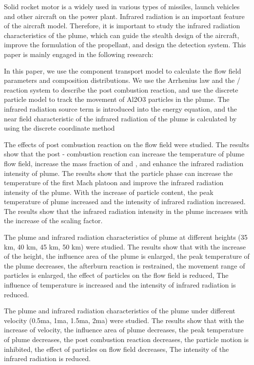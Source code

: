 \begin{enabstract}
 Solid rocket motor is a widely used in various types of missiles, launch vehicles and other aircraft on the power plant. Infrared radiation is an important feature of the aircraft model. Therefore, it is important to study the infrared radiation characteristics of the plume, which can guide the stealth design of the aircraft, improve the formulation of the propellant, and design the detection system. This paper is mainly engaged in the following research:
 
 In this paper, we use the component transport model to calculate the flow field parameters and composition distributions. We use the Arrhenius law and the /  reaction system to describe the post combustion reaction, and use the discrete particle model to track the movement of Al2O3 particles in the plume. The infrared radiation source term is introduced into the energy equation, and the near field characteristic of the infrared radiation of the plume is calculated by using the discrete coordinate method
 
 The effects of post combustion reaction on the flow field were studied. The results show that the post - combustion reaction can increase the temperature of plume flow field, increase the mass fraction of  and , and enhance the infrared radiation intensity of plume. The results show that the particle phase can increase the temperature of the first Mach platoon and improve the infrared radiation intensity of the plume. With the increase of particle content, the peak temperature of plume increased and the intensity of infrared radiation increased. The results show that the infrared radiation intensity in the plume increases with the increase of the scaling factor.
 
 The plume and infrared radiation characteristics of plume at different heights (35 \si{km}, 40 km, 45 km, 50 km) were studied. The results show that with the increase of the height, the influence area of the plume is enlarged, the peak temperature of the plume decreases, the afterburn reaction is restrained, the movement range of particles is enlarged, the effect of particles on the flow field is reduced, The influence of temperature is increased and the intensity of infrared radiation is reduced.
 
 The plume and infrared radiation characteristics of the plume under different velocity (0.5ma, 1ma, 1.5ma, 2ma) were studied. The results show that with the increase of velocity, the influence area of plume decreases, the peak temperature of plume decreases, the post combustion reaction decreases, the particle motion is inhibited, the effect of particles on flow field decreases, The intensity of the infrared radiation is reduced.
 

\end{enabstract}
